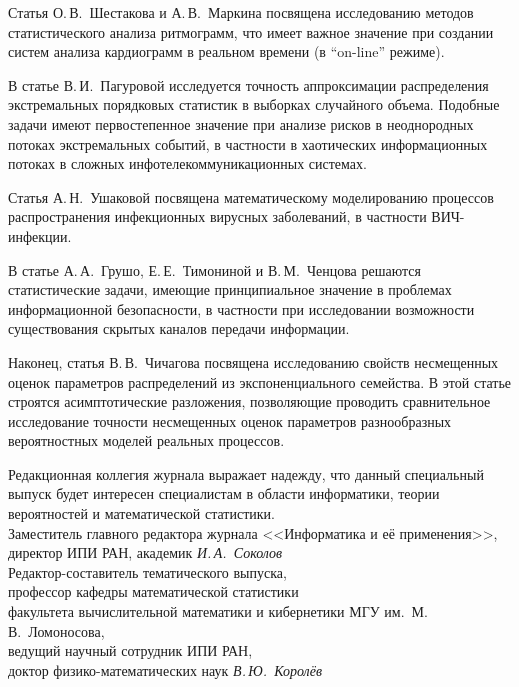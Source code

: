 {{       Статья О.\,В.~Шестакова и А.\,В.~Маркина посвящена исследованию методов статистического
анализа ритмограмм, что имеет важное значение при создании систем анализа кардиограмм в реальном
времени (в ``on-line'' режиме).

       В статье В.\,И.~Пагуровой исследуется точность аппроксимации распределения экстремальных
порядковых статистик в выборках случайного объема. Подобные задачи имеют первостепенное значение
при анализе рисков в неоднородных потоках экстремальных событий, в частности в хаотических
информационных потоках в сложных инфотелекоммуникационных системах.

       Статья А.\,Н.~Ушаковой посвящена математическому моделированию процессов распространения
инфекционных вирусных заболеваний, в частности ВИЧ-инфекции.

       В статье А.\,А.~Грушо, Е.\,Е.~Тимониной и В.\,М.~Ченцова решаются статистические задачи,
имеющие принципиальное значение в проблемах информационной безопасности, в частности при
исследовании возможности существования скрытых каналов передачи информации.

       Наконец, статья В.\,В.~Чичагова посвящена исследованию свойств несмещенных оценок
параметров распределений из экспоненциального семейства. В этой статье строятся асимптотические
разложения, позволяющие проводить сравнительное исследование точности несмещенных оценок
параметров разнообразных вероятностных моделей реальных процессов.

       Редакционная коллегия журнала выражает надежду, что данный специальный выпуск будет
интересен специалистам в области информатики, теории вероятностей и математической статистики.\\

\noindent
Заместитель главного редактора журнала <<Информатика и её применения>>,\\
директор ИПИ РАН, академик  \hfill
\textit{И.\,А.~Соколов}\\

\noindent
Редактор-составитель тематического выпуска,\\
профессор кафедры математической статистики\\
факультета вычислительной математики и кибернетики МГУ им.~М.\,В.~Ломоносова,\\
ведущий научный сотрудник ИПИ РАН,\\
доктор физико-математических наук\hfill
 \textit{В.\,Ю.~Королёв}


} }